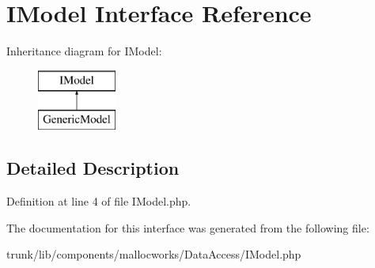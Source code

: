 \hypertarget{interface_utopia_1_1_components_1_1_model_1_1_i_model}{
\section{IModel Interface Reference}
\label{interface_utopia_1_1_components_1_1_model_1_1_i_model}
}
Inheritance diagram for IModel:\begin{figure}[H]
\begin{center}
\leavevmode
\includegraphics[height=2.000000cm]{interface_utopia_1_1_components_1_1_model_1_1_i_model}
\end{center}
\end{figure}


\subsection{Detailed Description}


Definition at line 4 of file IModel.php.



The documentation for this interface was generated from the following file:\begin{DoxyCompactItemize}
\item 
trunk/lib/components/mallocworks/DataAccess/IModel.php\end{DoxyCompactItemize}
